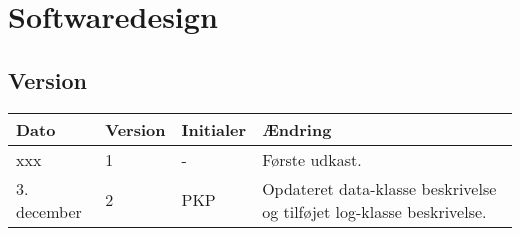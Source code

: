 \chapter{Softwaredesign}

\section*{Version}
\begin{table}[h]
	\centering
	\begin{tabularx}{\textwidth - 2cm}{|l|l|l|X|}
	\hline
	Dato			& Version		& Initialer 	& Ændring			\\ \hline
	xxx 			& 1 			& -			& Første udkast. 	\\ \hline
	3. december 	& 2 			& PKP			& Opdateret data-klasse beskrivelse og tilføjet log-klasse beskrivelse. 	\\ \hline
	\end{tabularx}
\end{table}
\clearpage



